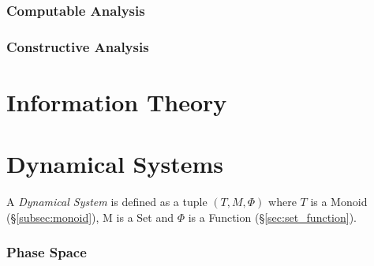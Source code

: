 \documentclass{article}
\begin{document}
\section{Computable Analysis}\label{sec:computable_analysis}



\section{Constructive Analysis}\label{sec:constructive_analysis}



\part{Information Theory}\label{sec:information_theory}



\part{Dynamical Systems}\label{sec:dynamical_systems}

A \emph{Dynamical System} is defined as a tuple $(T,M,\Phi)$ where $T$
is a Monoid (\S\ref{subsec:monoid}), M is a Set and $\Phi$ is a
Function (\S\ref{sec:set_function}).



\section{Phase Space}\label{sec:phase_space}
\end{document}
